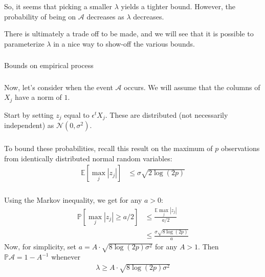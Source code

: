 \begin{frame}[fragile] \frametitle{}

So, it seems that picking a smaller $\lambda$ yields a tighter bound. However,
the probability of being on $\mathcal{A}$ decreases as $\lambda$ decreases.

There is ultimately a trade off to be made, and we will see that it is
possible to parameterize $\lambda$ in a nice way to show-off the various bounds.

\end{frame}

\begin{frame}[fragile] \frametitle{}

\begin{flushright}
{\color{yaleblue}\sc\fontsize{1cm}{0cm}\selectfont Bounds on empirical process}
\end{flushright}

\end{frame}

\begin{frame}[fragile] \frametitle{}

Now, let's consider when the event $\mathcal{A}$ occurs.
We will assume that the columns of $X_j$ have a norm of $1$.

Start by setting $z_j$ equal to $\epsilon^t X_j$. These are
distributed (not necessarily independent) as
$\mathcal{N}(0, \sigma^2)$.

\end{frame}

\begin{frame}[fragile] \frametitle{}

To bound these probabilities, recall this result on the
maximum of $p$ observations from identically distributed
normal random variables:
\begin{align*}
\mathbb{E} \left[ \max_j | z_j | \right] &\leq \sigma \sqrt{2 \log(2p)}
\end{align*}

\end{frame}

\begin{frame}[fragile] \frametitle{}

Using the Markov inequality, we get for any $a>0$:
\begin{align*}
\mathbb{P} \left[\max_j | z_j | \geq a / 2 \right]
 &\leq \frac{\mathbb{E} \max_j | z_j |}{a / 2} \\
 &\leq \frac{\sigma \sqrt{8 \log(2p)}}{a}
\end{align*}
\pause Now, for simplicity, set $a = A \cdot \sqrt{8 \log(2p) \sigma^2}$
for any $A > 1$. Then $\mathbb{P} \mathcal{A} = 1 - A^{-1}$ whenever
\begin{align*}
\lambda \geq A \cdot \sqrt{8 \log(2p) \sigma^2}
\end{align*}

\end{frame}


